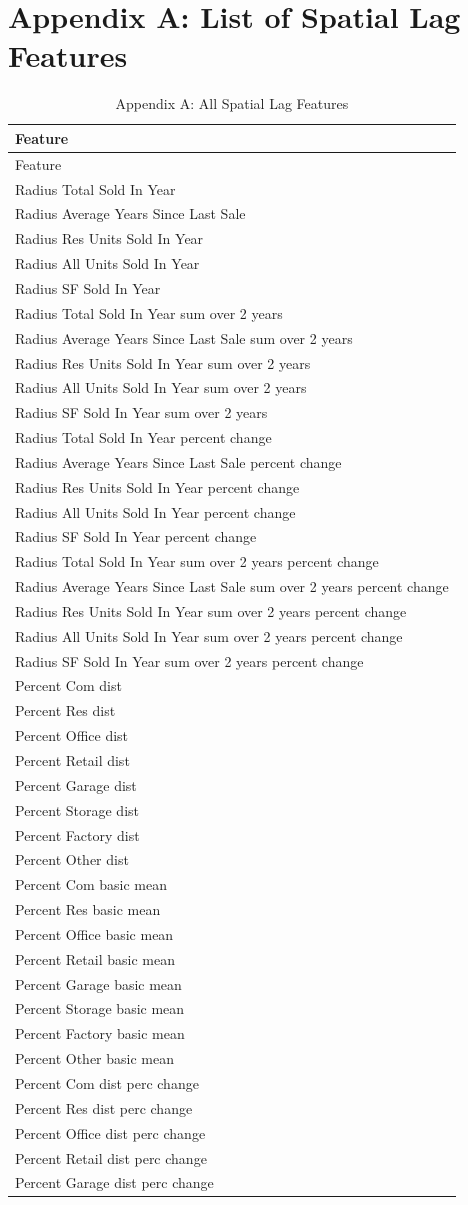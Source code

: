 \documentclass[12pt,]{article}
\begin{document}
\newpage

\section{Appendix A: List of Spatial Lag
Features}\label{appendix-a-list-of-spatial-lag-features}

\begin{longtable}[]{@{}l@{}}
\caption{Appendix A: All Spatial Lag Features}\tabularnewline
\toprule
Feature\tabularnewline
\midrule
\endfirsthead
\toprule
Feature\tabularnewline
\midrule
\endhead
Radius Total Sold In Year\tabularnewline
Radius Average Years Since Last Sale\tabularnewline
Radius Res Units Sold In Year\tabularnewline
Radius All Units Sold In Year\tabularnewline
Radius SF Sold In Year\tabularnewline
Radius Total Sold In Year sum over 2 years\tabularnewline
Radius Average Years Since Last Sale sum over 2 years\tabularnewline
Radius Res Units Sold In Year sum over 2 years\tabularnewline
Radius All Units Sold In Year sum over 2 years\tabularnewline
Radius SF Sold In Year sum over 2 years\tabularnewline
Radius Total Sold In Year percent change\tabularnewline
Radius Average Years Since Last Sale percent change\tabularnewline
Radius Res Units Sold In Year percent change\tabularnewline
Radius All Units Sold In Year percent change\tabularnewline
Radius SF Sold In Year percent change\tabularnewline
Radius Total Sold In Year sum over 2 years percent change\tabularnewline
Radius Average Years Since Last Sale sum over 2 years percent
change\tabularnewline
Radius Res Units Sold In Year sum over 2 years percent
change\tabularnewline
Radius All Units Sold In Year sum over 2 years percent
change\tabularnewline
Radius SF Sold In Year sum over 2 years percent change\tabularnewline
Percent Com dist\tabularnewline
Percent Res dist\tabularnewline
Percent Office dist\tabularnewline
Percent Retail dist\tabularnewline
Percent Garage dist\tabularnewline
Percent Storage dist\tabularnewline
Percent Factory dist\tabularnewline
Percent Other dist\tabularnewline
Percent Com basic mean\tabularnewline
Percent Res basic mean\tabularnewline
Percent Office basic mean\tabularnewline
Percent Retail basic mean\tabularnewline
Percent Garage basic mean\tabularnewline
Percent Storage basic mean\tabularnewline
Percent Factory basic mean\tabularnewline
Percent Other basic mean\tabularnewline
Percent Com dist perc change\tabularnewline
Percent Res dist perc change\tabularnewline
Percent Office dist perc change\tabularnewline
Percent Retail dist perc change\tabularnewline
Percent Garage dist perc change\tabularnewline

\end{longtable}
\end{document}

